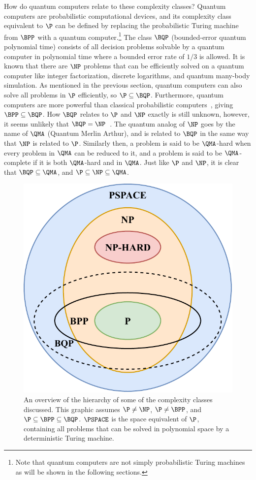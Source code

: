 How do quantum computers relate to these complexity classes?
Quantum computers are probabilistic computational devices, and its complexity class equivalent to $\P$ can be defined by replacing the probabilistic Turing machine from $\BPP$ with a quantum computer.\footnote{Note that quantum computers are not simply probabilistic Turing machines as will be shown in the following sections.}
The class $\BQP$ (bounded-error quantum polynomial time) consists of all decision problems solvable by a quantum computer in polynomial time where a bounded error rate of $1/3$ is allowed.
It is known that there are $\NP$ problems that can be efficiently solved on a quantum computer like integer factorization, discrete logarithms, and quantum many-body simulation.
As mentioned in the previous section, quantum computers can also solve all problems in $\P$ efficiently, so $\P \subseteq \BQP$.
Furthermore, quantum computers are more powerful than classical probabilistic computers~\cite{bernstein1997quantum}, giving $\BPP \subseteq \BQP$.
How $\BQP$ relates to $\P$ and $\NP$ exactly is still unknown, however, it seems unlikely that $\BQP = \NP$~\cite{aaronson2010bqp}.
The quantum analog of $\NP$ goes by the name of $\QMA$ (Quantum Merlin Arthur), and is related to $\BQP$ in the same way that $\NP$ is related to $\P$.
Similarly then, a problem is said to be $\QMA$-hard when every problem in $\QMA$ can be reduced to it, and a problem is said to be $\QMA$-complete if it is both $\QMA$-hard and in $\QMA$.
Just like $\P$ and $\NP$, it is clear that $\BQP \subseteq \QMA$, and $\P \subseteq \NP \subseteq \QMA$.

\begin{figure}[ht]
    \centering
    \includegraphics[width=0.375\linewidth]{figures/complexity-classes-hierarchy.pdf}
    \caption[An overview of the hierarchy of some of the complexity classes discussed.]{
        An overview of the hierarchy of some of the complexity classes discussed.
        This graphic assumes $\P \neq \NP$, $\P \neq \BPP$, and $\P \subseteq \BPP \subseteq \BQP$.
        $\PSPACE$ is the space equivalent of $\P$, containing all problems that can be solved in polynomial space by a deterministic Turing machine.
    }
    \label{fig:complexity-classes-hierarchy}
\end{figure}


